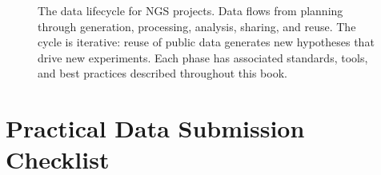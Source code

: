 \begin{figure}[htbp]
\begin{tikzpicture}
\end{tikzpicture}
\caption[The NGS data lifecycle.]{The data lifecycle for NGS projects. Data flows from planning through generation, processing, analysis, sharing, and reuse. The cycle is iterative: reuse of public data generates new hypotheses that drive new experiments. Each phase has associated standards, tools, and best practices described throughout this book.}
\label{fig:data-lifecycle}
\end{figure}

\section{Practical Data Submission Checklist}
\label{sec:datastandards:checklist}

